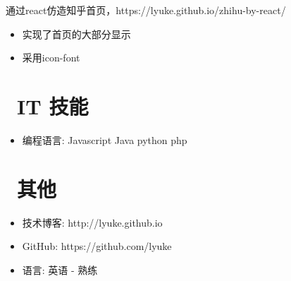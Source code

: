 \documentclass{resume}
\begin{document}
\begin{onehalfspacing}
通过react仿造知乎首页，https://lyuke.github.io/zhihu-by-react/
\begin{itemize}
  \item 实现了首页的大部分显示
  \item 采用icon-font
\end{itemize}
\end{onehalfspacing}


\section{\faCogs\ IT 技能}
\begin{itemize}[parsep=0.5ex]
  \item 编程语言: Javascript Java python php
\end{itemize}


\section{\faInfo\ 其他}
\begin{itemize}[parsep=0.5ex]
  \item 技术博客: http://lyuke.github.io
  \item GitHub: https://github.com/lyuke
  \item 语言: 英语 - 熟练
\end{itemize}

%
%
\end{document}
